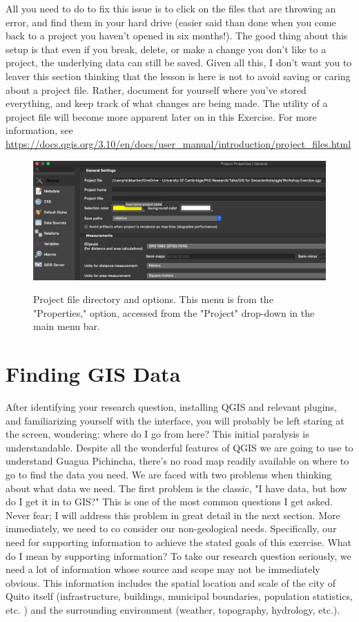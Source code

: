 \documentclass{article}
\begin{document}
All you need to do to fix this issue is to click on the files that are throwing an error, and find them in your hard drive (easier said than done when you come back to a project you haven't opened in six months!). The good thing about this setup is that even if you break, delete, or make a change you don't like to a project, the underlying data can still be saved. Given all this, I don't want you to leaver this section thinking that the lesson is here is not to avoid saving or caring about a project file. Rather, document for yourself where you've stored everything, and keep track of what changes are being made. The utility of a project file will become more apparent later on in this Exercise. For more information, see \url{https://docs.qgis.org/3.10/en/docs/user_manual/introduction/project_files.html}

\begin{figure}[htbp]
    \centering
    \includegraphics[width=\textwidth]{Figure 5.png}
    \label{fig5}
    \caption{Project file directory and options. This menu is from the "Properties," option, accessed from the "Project" drop-down in the main menu bar.}
\end{figure}

\section{Finding GIS Data}

After identifying your research question, installing QGIS and relevant plugins, and familiarizing yourself with the interface, you will probably be left staring at the screen, wondering: where do I go from here? This initial paralysis is understandable. Despite all the wonderful features of QGIS we are going to use to understand Guagua Pichincha, there's no road map readily available on where to go to find the data you need. We are faced with two problems when thinking about what data we need. The first problem is the classic, "I have data, but how do I get it in to GIS?" This is one of the most common questions I get asked. Never fear; I will address this problem in great detail in the next section. More immediately, we need to co consider our non-geological needs. Specifically, our need for supporting information to achieve the stated goals of this exercise. What do I mean by supporting information? To take our research question seriously, we need a lot of information whose source and scope may not be immediately obvious. This information includes the spatial location and scale of the city of Quito itself (infrastructure, buildings, municipal boundaries, population statistics, etc. ) and the surrounding environment (weather, topography, hydrology, etc.). 
\end{document}

